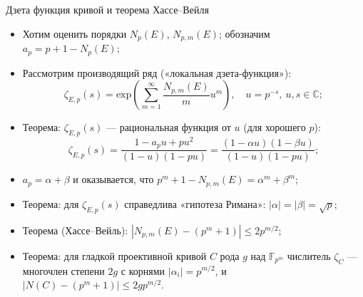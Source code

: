 \documentclass[serif, aspectratio=169]{beamer}
\begin{document}
\begin{frame}{Дзета функция кривой и теорема Хассе--Вейля}
    \begin{itemize}
        \item Хотим оценить порядки $N_p(E)$, $N_{p,m}(E)$; обозначим $a_p=p+1-N_p(E)$;
        \item Рассмотрим производящий ряд («локальная дзета-функция»):
        \[\zeta_{E,p}(s) = \mathrm{exp} \left( \sum_{m=1}^\infty \frac{N_{p,m}(E)}{m} u^m \right), \quad u=p^{-s},\ u,s \in \mathbb{C};\]
        \item Теорема: $\zeta_{E,p}(s)$ --- рациональная функция от $u$ (для хорошего $p$):
        \[\zeta_{E,p}(s)=\frac{1-a_p u+p u^2}{(1-u)(1-pu)}=\frac{(1-\alpha u)(1-\beta u)}{(1-u)(1-pu)};\]
        \item $a_p = \alpha+\beta$ и оказывается, что $p^m+1 - N_{p,m}(E)=\alpha^m+\beta^m$;
        \item Теорема: для $\zeta_{E,p}(s)$ справедлива «гипотеза Римана»: $|\alpha|=|\beta|=\sqrt p$;
        \item Теорема (Хассе--Вейль): $|N_{p,m}(E)-(p^m+1)|\le 2p^{m/2}$;
        \item Теорема: для гладкой проективной кривой $C$ рода $g$ над $\mathbb{F}_{p^m}$ числитель $\zeta_{C}$ --- многочлен степени $2g$ с корнями $|\alpha_i|=p^{m/2}$, и $|N(C)-(p^m+1)|\le 2g p^{m/2}$.


    \end{itemize}
    \note{
        \begin{itemize}
            \item ---
        \end{itemize}
    }
\end{frame}
\end{document}
